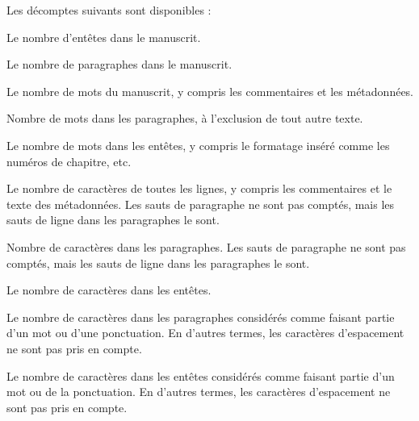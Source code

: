 \documentclass[a4paper,11pt,french]{sphinxmanual}
\begin{document}
\sphinxAtStartPar
Les décomptes suivants sont disponibles :
\begin{description}
\sphinxAtStartPar
Le nombre d’en\sphinxhyphen{}têtes dans le manuscrit.

\sphinxAtStartPar
Le nombre de paragraphes dans le manuscrit.

\sphinxAtStartPar
Le nombre de mots du manuscrit, y compris les commentaires et les métadonnées.

\sphinxAtStartPar
Nombre de mots dans les paragraphes, à l’exclusion de tout autre texte.

\sphinxAtStartPar
Le nombre de mots dans les en\sphinxhyphen{}têtes, y compris le formatage inséré comme les numéros de chapitre, etc.

\sphinxAtStartPar
Le nombre de caractères de toutes les lignes, y compris les commentaires et le texte des métadonnées. Les sauts de paragraphe ne sont pas comptés, mais les sauts de ligne dans les paragraphes le sont.

\sphinxAtStartPar
Nombre de caractères dans les paragraphes. Les sauts de paragraphe ne sont pas comptés, mais les sauts de ligne dans les paragraphes le sont.

\sphinxAtStartPar
Le nombre de caractères dans les en\sphinxhyphen{}têtes.

\sphinxAtStartPar
Le nombre de caractères dans les paragraphes considérés comme faisant partie d’un mot ou d’une ponctuation. En d’autres termes, les caractères d’espacement ne sont pas pris en compte.

\sphinxAtStartPar
Le nombre de caractères dans les en\sphinxhyphen{}têtes considérés comme faisant partie d’un mot ou de la ponctuation. En d’autres termes, les caractères d’espacement ne sont pas pris en compte.

\end{description}

\sphinxstepscope
\end{document}
